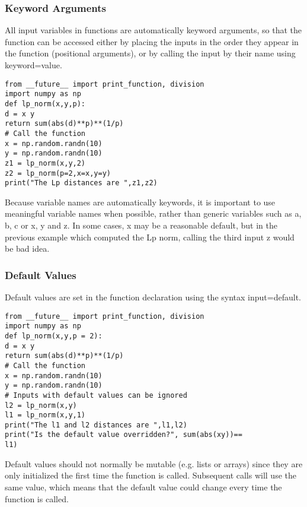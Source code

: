 \documentclass[KSmain.tex]{subfiles}
\begin{document}
\subsubsection{Keyword Arguments}
All input variables in functions are automatically keyword arguments, so that the function can be accessed
either by placing the inputs in the order they appear in the function (positional arguments), or by calling
the input by their name using keyword=value.
\begin{framed}
	\begin{verbatim}
from __future__ import print_function, division
import numpy as np
def lp_norm(x,y,p):
d = x y
return sum(abs(d)**p)**(1/p)
# Call the function
x = np.random.randn(10)
y = np.random.randn(10)
z1 = lp_norm(x,y,2)
z2 = lp_norm(p=2,x=x,y=y)
print("The Lp distances are ",z1,z2)
\end{verbatim}
\end{framed}

Because variable names are automatically keywords, it is important to use meaningful variable names
when possible, rather than generic variables such as a, b, c or x, y and z. In some cases, x may be a reasonable
default, but in the previous example which computed the Lp norm, calling the third input z would
be bad idea.
\subsubsection{Default Values}
Default values are set in the function declaration using the syntax input=default.
\begin{framed}
\begin{verbatim}
from __future__ import print_function, division
import numpy as np
def lp_norm(x,y,p = 2):
d = x y
return sum(abs(d)**p)**(1/p)
# Call the function
x = np.random.randn(10)
y = np.random.randn(10)
# Inputs with default values can be ignored
l2 = lp_norm(x,y)
l1 = lp_norm(x,y,1)
print("The l1 and l2 distances are ",l1,l2)
print("Is the default value overridden?", sum(abs(xy))==
l1)
\end{verbatim}
\end{framed}

Default values should not normally be mutable (e.g. lists or arrays) since they are only initialized the first
time the function is called. Subsequent calls will use the same value, which means that the default value
could change every time the function is called.
\end{document}
